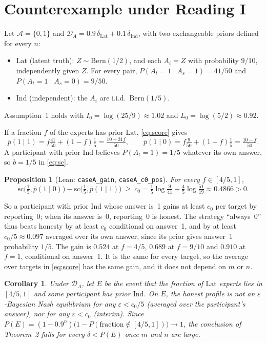 \documentclass[11pt]{article}
\newtheorem{proposition}{Proposition}
\newtheorem{corollary}{Corollary}
\theoremstyle{remark}
\newcommand{\cD}{\mathcal{D}}
\newcommand{\cA}{\mathcal{A}}
\newcommand{\Lat}{\mathrm{Lat}}
\newcommand{\Ind}{\mathrm{Ind}}
\newcommand{\pb}{\bar p}
\begin{document}
\section{Counterexample under Reading I}\label{sec:caseA}

Let $\cA=\{0,1\}$ and $\cD_A=0.9\,\delta_{\Lat}+0.1\,\delta_{\Ind}$, with two exchangeable priors defined for every $n$:
\begin{itemize}
\item $\Lat$ (latent truth): $Z\sim\mathrm{Bern}(1/2)$, and each $A_i=Z$ with probability $9/10$, independently given $Z$. For every pair, $P(A_t{=}1\mid A_s{=}1)=41/50$ and $P(A_t{=}1\mid A_s{=}0)=9/50$.
\item $\Ind$ (independent): the $A_i$ are i.i.d.\ $\mathrm{Bern}(1/5)$.
\end{itemize}
Assumption~1 holds with $I_0=\log(25/9)\approx1.02$ and $L_0=\log(5/2)\approx0.92$.

If a fraction $f$ of the experts has prior $\Lat$, \eqref{eq:score} gives
\begin{equation}
\pb(1\mid1)=f\tfrac{41}{50}+(1-f)\tfrac15=\tfrac{10+31f}{50},\qquad \pb(1\mid0)=f\tfrac{9}{50}+(1-f)\tfrac15=\tfrac{10-f}{50}.
\end{equation}
A participant with prior $\Ind$ believes $P(A_t{=}1)=1/5$ whatever its own answer, so $b=1/5$ in \eqref{eq:sc}.

\begin{proposition}[Lean: \texttt{caseA\_gain}, \texttt{caseA\_c0\_pos}]\label{prop:A}
For every $f\in[4/5,1]$,
\[
\mathrm{sc}\big(\tfrac15,\pb(1\mid0)\big)-\mathrm{sc}\big(\tfrac15,\pb(1\mid1)\big)\ \ge\ c_0=\tfrac15\log\tfrac{9}{41}+\tfrac45\log\tfrac{51}{19}\approx0.4866>0.
\]
\end{proposition}

So a participant with prior $\Ind$ whose answer is~1 gains at least $c_0$ per target by reporting~0; when its answer is~0, reporting~0 is honest. The strategy ``always~0'' thus beats honesty by at least $c_0$ conditional on answer~1, and by at least $c_0/5\approx0.097$ averaged over its own answer, since its prior gives answer~1 probability $1/5$. The gain is $0.524$ at $f=4/5$, $0.689$ at $f=9/10$ and $0.910$ at $f=1$, conditional on answer~1. It is the same for every target, so the average over targets in \eqref{eq:score} has the same gain, and it does not depend on $m$ or $n$.

\begin{corollary}\label{cor:A}
Under $\cD_A$, let $E$ be the event that the fraction of $\Lat$ experts lies in $[4/5,1]$ and some participant has prior $\Ind$. On $E$, the honest profile is not an $\varepsilon$-Bayesian Nash equilibrium for any $\varepsilon<c_0/5$ (averaged over the participant's answer), nor for any $\varepsilon<c_0$ (interim). Since $P(E)=(1-0.9^n)\big(1-P(\text{fraction}\notin[4/5,1])\big)\to1$, the conclusion of Theorem~2 fails for every $\delta<P(E)$ once $m$ and $n$ are large.
\end{corollary}
\end{document}
